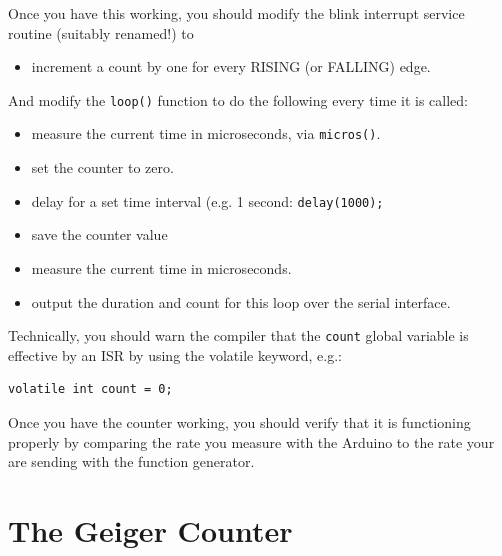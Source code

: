 \documentclass[12pt]{article}
\begin{document}
Once you have this working, you should modify the blink interrupt service routine (suitably renamed!) to
\begin{itemize}
\item increment a count by one for every RISING (or FALLING) edge.
\end{itemize}
And modify the {\tt loop()} function to do the following every time it is called:
\begin{itemize}
\item measure the current time in microseconds, via {\tt micros()}.
\item set the counter to zero.
\item delay for a set time interval (e.g. 1 second:  {\tt delay(1000); }
\item save the counter value
\item measure the current time in microseconds.
\item output the duration and count for this loop over the serial interface.
\end{itemize}
Technically, you should warn the compiler that the {\tt count} global variable is effective by an ISR by using the volatile keyword, e.g.:
\begin{verbatim}
volatile int count = 0;
\end{verbatim}

Once you have the counter working, you should verify that it is functioning properly by comparing the rate you measure with the Arduino to the rate your are sending with the function generator.


\section{The Geiger Counter}
\end{document}
